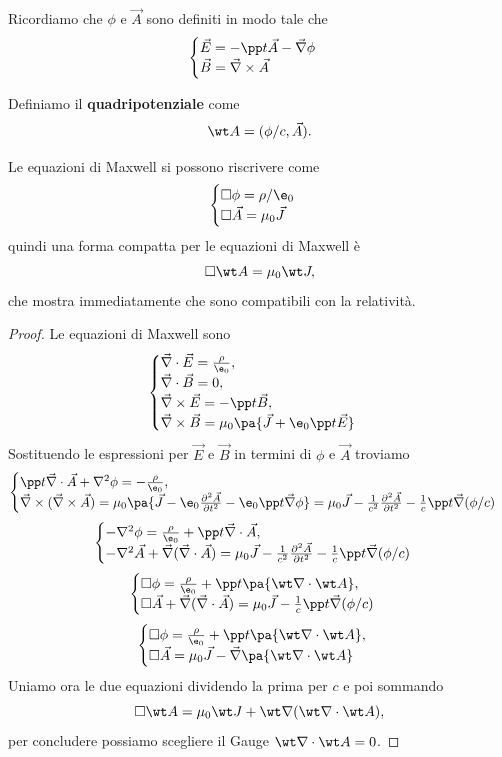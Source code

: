 \noindent
Ricordiamo che $\phi$ e $\vec A$ sono definiti in modo tale che
\[\begin{cases}
\vec E=-\pp t{\vec A}-\vec \nabla \phi\\
\vec B=\vec \nabla \times \vec A
\end{cases}\]

\begin{definition}[Quadripotenziale]
Definiamo il \textbf{quadripotenziale} come
\[\wt A=(\phi/c,\vec A).\]
\end{definition}


\begin{remark}
Le equazioni di Maxwell si possono riscrivere come
\[\begin{cases}
\square\phi=\rho/\e_0\\
\square \vec A=\mu_0\vec J
\end{cases}\]
quindi una forma compatta per le equazioni di Maxwell \`e
\[\square\wt A=\mu_0\wt J,\]
che mostra immediatamente che sono compatibili con la relativit\`a.
\end{remark}
\begin{proof}
Le equazioni di Maxwell sono
\[\begin{cases}
\vec\nabla\cdot \vec E=\frac\rho{\e_0},\\
\vec\nabla\cdot\vec B=0,\\
\vec \nabla \times \vec E=-\pp t{\vec B},\\
\vec \nabla \times \vec B=\mu_0\pa{\vec J+\e_0\pp t{\vec E}}
\end{cases}\]
Sostituendo le espressioni per $\vec E$ e $\vec B$ in termini di $\phi$ e $\vec A$ troviamo
\[\begin{cases}
\pp t{}\vec\nabla\cdot \vec A +\nabla^2 \phi=-\frac\rho{\e_0},\\
\vec \nabla \times (\vec \nabla \times \vec A)=\mu_0\pa{\vec J-\e_0\pps[2] t{\vec A}-\e_0\pp t{}\vec \nabla \phi}=\mu_0\vec J-\frac1{c^2}\pps[2]t{\vec A}-\frac1c\pp t{}\vec\nabla(\phi/c)
\end{cases}\]
\[\begin{cases}
-\nabla^2 \phi=\frac\rho{\e_0}+\pp t{}\vec\nabla\cdot \vec A,\\
-\nabla^2\vec A+\vec\nabla(\vec\nabla\cdot\vec A)=\mu_0\vec J-\frac1{c^2}\pps[2]t{\vec A}-\frac1c\pp t{}\vec\nabla(\phi/c)
\end{cases}\]
\[\begin{cases}
\square \phi = \frac\rho{\e_0}+\pp t{}\pa{\wt \nabla \cdot \wt A},\\
\square\vec A +\vec\nabla(\vec\nabla\cdot\vec A)=\mu_0\vec J-\frac1c\pp t{}\vec\nabla(\phi/c)
\end{cases}\]
\[\begin{cases}
\square \phi =\frac\rho{\e_0}+\pp t{}\pa{\wt \nabla \cdot \wt A},\\
\square\vec A =\mu_0\vec J-\vec\nabla\pa{\wt \nabla \cdot \wt A}  
\end{cases}\]
Uniamo ora le due equazioni dividendo la prima per $c$ e poi sommando
\[\square \wt A=\mu_0\wt J +\wt \nabla(\wt \nabla\cdot \wt A),\]
per concludere possiamo scegliere il Gauge $\wt \nabla \cdot \wt A=0$.
\end{proof}

